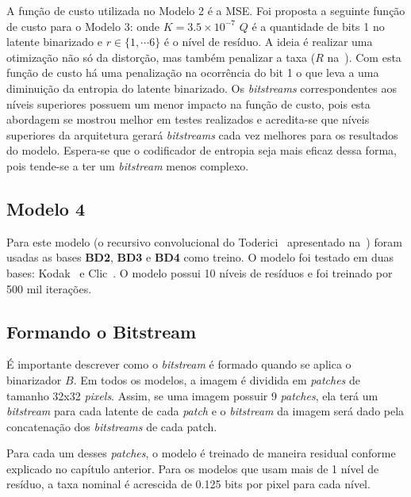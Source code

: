 A função de custo utilizada no Modelo 2 é a \acrshort{MSE}. Foi proposta a seguinte função de custo para o Modelo 3: 
onde $K = 3.5 \times 10^{-7}$ $Q$ é a quantidade de bits 1 no latente binarizado e $r \in \{1, \cdots 6\}$ é o nível de resíduo. A ideia é realizar uma otimização não só da distorção, mas também penalizar a taxa ($R$ na~). Com esta função de custo há uma penalização na ocorrência do bit 1 o que leva a uma diminuição da entropia do latente binarizado. Os \textit{bitstreams} correspondentes aos níveis superiores possuem um menor impacto na função de custo, pois esta abordagem se mostrou melhor em testes realizados e acredita-se que níveis superiores da arquitetura gerará \textit{bitstreams} cada vez melhores para os resultados do modelo. Espera-se que o codificador de entropia seja mais eficaz dessa forma, pois tende-se a ter um \textit{bitstream} menos complexo.
\subsection{Modelo 4}
Para este modelo (o recursivo convolucional do Toderici~\cite{toderici2016} apresentado na~) foram usadas as bases \textbf{BD2}, \textbf{BD3} e \textbf{BD4} como treino. O modelo foi testado em duas bases: Kodak~\cite{kodak} e Clic~\cite{clic}. O modelo possui 10 níveis de resíduos e foi treinado por 500 mil iterações.
\subsection{Formando o Bitstream}
É importante descrever como o \textit{bitstream} é formado quando se aplica o binarizador $B$. Em todos os modelos, a imagem é dividida em \textit{patches} de tamanho 32x32 \textit{pixels}. Assim, se uma imagem possuir 9 \textit{patches}, ela terá um \textit{bitstream} para cada latente de cada \textit{patch} e o \textit{bitstream} da imagem será dado pela concatenação dos \textit{bitstreams} de cada patch. 

Para cada um desses \textit{patches}, o modelo é treinado de maneira residual conforme explicado no capítulo anterior. Para os modelos que usam mais de 1 nível de resíduo, a taxa nominal é acrescida de 0.125 bits por pixel para cada nível. 

